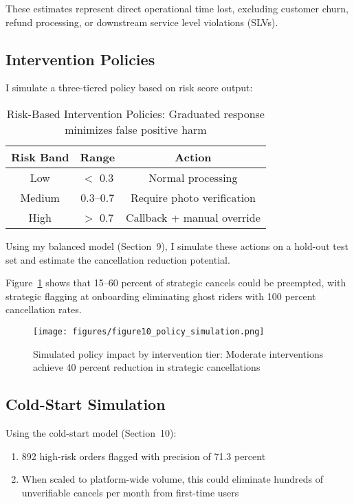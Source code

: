 \documentclass[12pt,letterpaper]{article}
\begin{document}
These estimates represent direct operational time lost, excluding customer churn, refund processing, or downstream service level violations (SLVs).

\subsection{Intervention Policies}

I simulate a three-tiered policy based on risk score output:

\begin{table}[H]
\centering
\caption{Risk-Based Intervention Policies: Graduated response minimizes false positive harm}
\label{tab:intervention_policy}
\begin{tabular}{ccc}
\toprule
\textbf{Risk Band} & \textbf{Range} & \textbf{Action} \\
\midrule
Low & $<$ 0.3 & Normal processing \\
Medium & 0.3--0.7 & Require photo verification \\
High & $>$ 0.7 & Callback + manual override \\
\bottomrule
\end{tabular}
\end{table}

Using my balanced model (Section~9), I simulate these actions on a hold-out test set and estimate the cancellation reduction potential.

Figure~\ref{fig:policy_impact} shows that 15--60 percent of strategic cancels could be preempted, with strategic flagging at onboarding eliminating ghost riders with 100 percent cancellation rates.

\begin{figure}[H]
\centering
\texttt{[image: figures/figure10\_policy\_simulation.png]}
\caption{Simulated policy impact by intervention tier: Moderate interventions achieve 40 percent reduction in strategic cancellations}
\label{fig:policy_impact}
\end{figure}

\subsection{Cold-Start Simulation}

Using the cold-start model (Section~10):

\begin{enumerate}
    \item 892 high-risk orders flagged with precision of 71.3 percent
    \item When scaled to platform-wide volume, this could eliminate hundreds of unverifiable cancels per month from first-time users
\end{enumerate}
\end{document}
